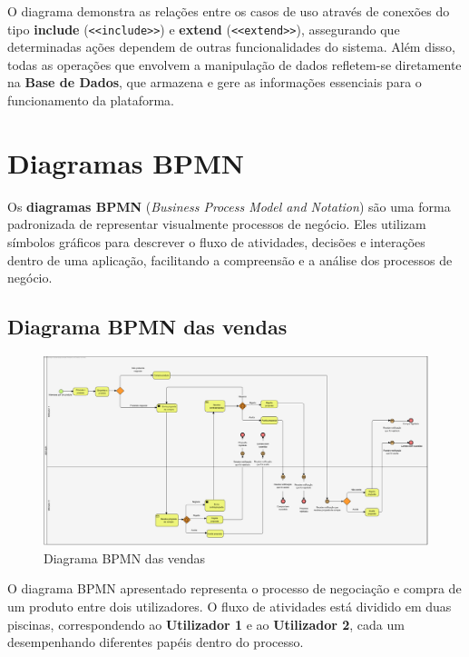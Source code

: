 \documentclass[a4paper, 12pt]{article} %
\begin{document}
O diagrama demonstra as relações entre os casos de uso através de conexões do tipo \textbf{include} (\texttt{<<include>>}) e \textbf{extend} (\texttt{<<extend>>}), assegurando que determinadas ações dependem de outras funcionalidades do sistema. Além disso, todas as operações que envolvem a manipulação de dados refletem-se diretamente na \textbf{Base de Dados}, que armazena e gere as informações essenciais para o funcionamento da plataforma.
\newpage
\section{Diagramas BPMN}

Os \textbf{diagramas BPMN} (\textit{Business Process Model and Notation}) são uma forma padronizada de representar visualmente processos de negócio. Eles utilizam símbolos gráficos para descrever o fluxo de atividades, decisões e interações dentro de uma aplicação, facilitando a compreensão e a análise dos processos de negócio.

\subsection{Diagrama BPMN das vendas}

\begin{figure}[ht]
	\centering
	\includegraphics[width=\textwidth]{../images/bpmn-sales.png}
	\caption{Diagrama BPMN das vendas}
	\label{fig:bpmn vendas}
\end{figure}


O diagrama BPMN apresentado representa o processo de negociação e compra de um produto entre dois utilizadores. O fluxo de atividades está dividido em duas piscinas, correspondendo ao \textbf{Utilizador 1} e ao \textbf{Utilizador 2}, cada um desempenhando diferentes papéis dentro do processo.
\end{document}
